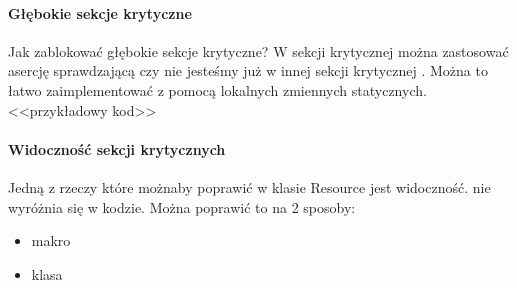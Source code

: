 \paragraph{Głębokie sekcje krytyczne}
Jak zablokować głębokie sekcje krytyczne? W sekcji krytycznej można zastosować asercję sprawdzającą czy nie jesteśmy już w innej sekcji krytycznej . Można to łatwo zaimplementować z pomocą lokalnych zmiennych statycznych. <<przykładowy kod>>

\paragraph{Widoczność sekcji krytycznych}
Jedną z rzeczy które możnaby poprawić w klasie Resource jest widoczność.  nie wyróżnia się w kodzie. Można poprawić to na 2 sposoby:
\begin{itemize}
\item makro\\
\item klasa\\
  \\
\end{itemize}
